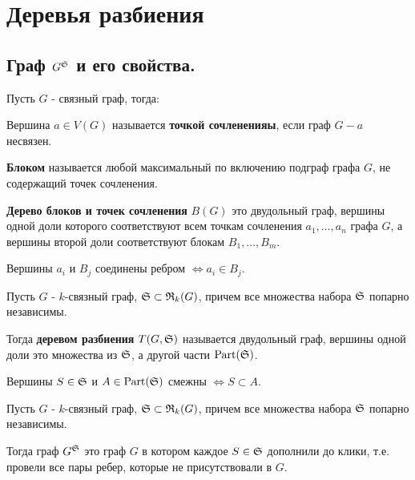 \documentclass[../main.tex]{subfiles}
\begin{document}
\section{Деревья разбиения}

\subsection{Граф $G^{\S}$ и его свойства.}

Пусть $G$ - связный граф, тогда:

\begin{df*}
	Вершина $a \in V(G)$ называется \textbf{точкой сочлененияы}, если граф  $G - a$ несвязен.
\end{df*}

\begin{df*}[Блок]
	\textbf{Блоком} называется любой максимальный по включению подграф графа $G$, не содержащий точек сочленения.
\end{df*}

\begin{df*}
	\textbf{Дерево блоков и точек сочленения} $B(G)$ это двудольный граф, вершины одной доли которого соответствуют всем точкам сочленения  $a_1, \ldots, a_n$ графа $G$, а вершины второй доли соответствуют блокам  $B_1, \ldots, B_m$.

	Вершины  $a_i$ и  $B_j$ соединены ребром  $\iff a_i \in B_j$.
\end{df*}

\begin{df*} \label{definition:tree_of_partition}
	Пусть $G$ - $k$-связный граф, $\S \subset \R_k(G)$, причем все множества набора $\S$ попарно независимы.

	Тогда \textbf{деревом разбиения} $T(G, \S)$ называется двудольный граф, вершины одной доли это множества из $\S$, а другой части $\Part(\S)$.

	Вершины $S \in \S$ и $A \in \Part(\S)$ смежны $\iff S \subset A$.
\end{df*}

\begin{df*}[$G^{\S}$]
	Пусть $G$ - $k$-связный граф, $\S \subset \R_k(G)$, причем все множества набора $\S$ попарно независимы.

	Тогда граф $G^\S$ это граф $G$ в котором каждое $S \in \S$ дополнили до клики, т.е. провели все пары ребер, которые не присутствовали в $G$.
\end{df*}
\end{document}
